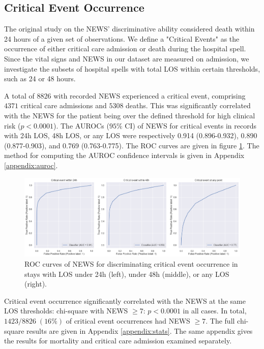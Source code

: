 \documentclass[10pt,journal,compsoc]{IEEEtran}
\begin{document}
\subsection{Critical Event Occurrence} The original study on the NEWS' discriminative ability considered death within 24 hours of a given set of observations. We define a "Critical Events" as the occurrence of either critical care admission or death during the hospital spell. Since the vital signs and NEWS in our dataset are measured on admission, we investigate the subsets of hospital spells with total LOS within certain thresholds, such as 24 or 48 hours.

A total of $8826$ with recorded NEWS experienced a critical event, comprising $4371$ critical care admissions and $5308$ deaths. This was significantly correlated with the NEWS for the patient being over the defined threshold for high clinical risk ($p<0.0001$). The AUROCs ($95\%$ CI) of NEWS for critical events in records with 24h LOS, 48h LOS, or any LOS were respectively 0.914 (0.896-0.932), 0.890 (0.877-0.903), and 0.769 (0.763-0.775). The ROC curves are given in figure \ref{fig:criticalevent_roc}. The method for computing the AUROC confidence intervals is given in Appendix \ref{appendix:auroc}.

\begin{figure}[htbp]
    \centering
    \includegraphics[width=\textwidth]{img/critical_event_roc.png}
    \caption{ROC curves of NEWS for discriminating critical event occurrence in stays with LOS under 24h (left), under 48h (middle), or any LOS (right).}
    \label{fig:criticalevent_roc}
\end{figure}

Critical event occurrence significantly correlated with the NEWS at the same LOS thresholds: chi-square with NEWS $\geq 7$: $p < 0.0001$ in all cases. In total, $1423/8826 \; (16\%)$ of critical event occurrences had NEWS $\geq 7$. The full chi-square results are given in Appendix \ref{appendix:stats}. The same appendix gives the results for mortality and critical care admission examined separately.
\end{document}
